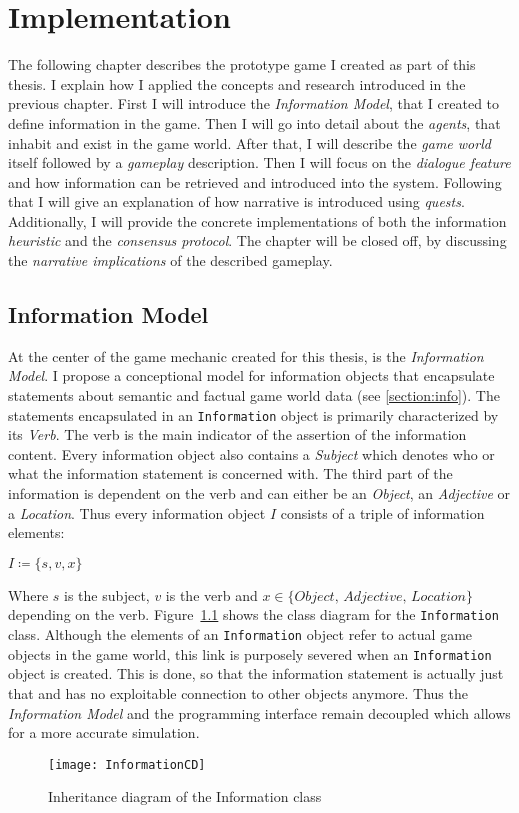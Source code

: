 \chapter{Implementation} %
The following chapter describes the prototype game I created as part of this thesis. I explain how I applied the concepts and research introduced in the previous chapter. First I will introduce the \textit{Information Model}, that I created to define information in the game. Then I will go into detail about the \textit{agents}, that inhabit and exist in the game world. After that, I will describe the \textit{game world} itself followed by a \textit{gameplay} description. Then I will focus on the \textit{dialogue feature} and how information can be retrieved and introduced into the system. Following that I will give an explanation of how narrative is introduced using \textit{quests}. Additionally, I will provide the concrete implementations of both the information \textit{heuristic} and the \textit{consensus protocol}. The chapter will be closed off, by discussing the \textit{narrative implications} of the described gameplay.

\section{Information Model}
At the center of the game mechanic created for this thesis, is the \textit{Information Model}. I propose a conceptional model for information objects that encapsulate statements about semantic and factual game world data (see \ref{section:info}). The statements encapsulated in an \verb|Information| object is primarily characterized by its \textit{Verb}. The verb is the main indicator of the assertion of the information content. Every information object also contains a \textit{Subject} which denotes who or what the information statement is concerned with. The third part of the information is dependent on the verb and can either be an \textit{Object}, an \textit{Adjective} or a \textit{Location}.
Thus every information object $I$ consists of a triple of information elements:
\begin{center}
	$I \coloneqq \{s, v, x\}$ 
\end{center}
Where $s$ is the subject, $v$ is the verb and $x \in \{\textit{Object, Adjective, Location}\}$ depending on the verb. Figure~\ref{fig:informationCD} shows the class diagram for the \verb|Information| class. Although the elements of an \verb|Information| object refer to actual game objects in the game world, this link is purposely severed when an \verb|Information| object is created. This is done, so that the information statement is actually just that and has no exploitable connection to other objects anymore. Thus the \textit{Information Model} and the programming interface remain decoupled which allows for a more accurate simulation.
\begin{figure}
	\centering
	\texttt{[image: InformationCD]}
	\caption{Inheritance diagram of the Information class}
	\label{fig:informationCD}
\end{figure}

